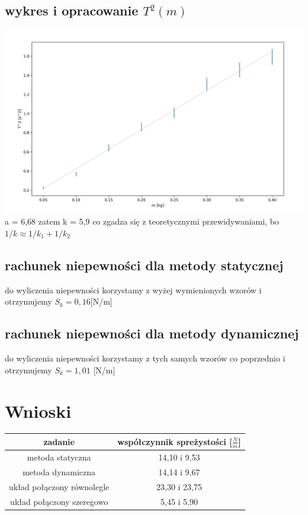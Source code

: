 \documentclass{article}
\begin{document}
\subsection{wykres i opracowanie $T^2(m)$}
\includegraphics[width=15cm]{m7_2_2}
a = 6,68 zatem k = 5,9 co zgadza się z teoretycznymi przewidywaniami, bo $1/k \approx 1/k_1 + 1/k_2$

\subsection{rachunek niepewności dla metody statycznej}
do wyliczenia niepewności korzystamy z wyżej wymienionych wzorów i otrzymujemy 
$S_k = 0,16 $[N/m]

\subsection{rachunek niepewności dla metody dynamicznej}
do wyliczenia niepewności korzystamy z tych samych wzorów co poprzednio i otrzymujemy
$S_k = 1, 01$ [N/m]


\section{Wnioski}

\begin{center}
\begin{tabular}{ c | c }
zadanie & współczynnik spreżystości [$\frac{N}{m}$]  \\


\hline
 metoda statyczna  & 14,10 i 9,53\\  
 metoda dynamiczna & 14,14 i 9,67 \\
 układ połączony równolegle& 23,30 i 23,75 \\
 układ połączony szeregowo & 5,45 i 5,90 
\end{tabular}
\end{center}
\end{document}
